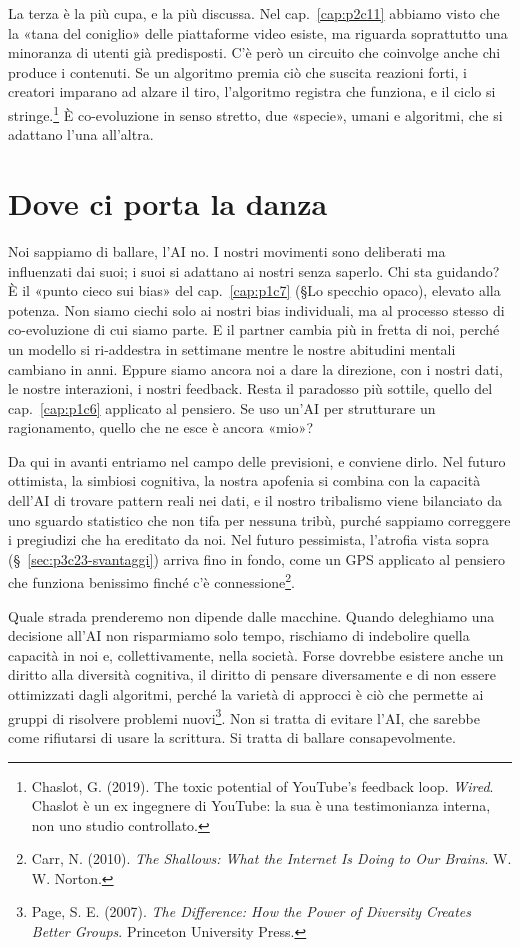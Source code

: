 La terza è la più cupa, e la più discussa. Nel cap.~\ref{cap:p2c11} abbiamo visto che la «tana del coniglio» delle piattaforme video esiste, ma riguarda soprattutto una minoranza di utenti già predisposti. C'è però un circuito che coinvolge anche chi produce i contenuti. Se un algoritmo premia ciò che suscita reazioni forti, i creatori imparano ad alzare il tiro, l'algoritmo registra che funziona, e il ciclo si stringe.\footnote{Chaslot, G. (2019). The toxic potential of YouTube's feedback loop. \textit{Wired}. Chaslot è un ex ingegnere di YouTube: la sua è una testimonianza interna, non uno studio controllato.} È co-evoluzione in senso stretto, due «specie», umani e algoritmi, che si adattano l'una all'altra.

\section{Dove ci porta la danza}

Noi sappiamo di ballare, l'AI no. I nostri movimenti sono deliberati ma influenzati dai suoi; i suoi si adattano ai nostri senza saperlo. Chi sta guidando? È il «punto cieco sui bias» del cap.~\ref{cap:p1c7} (§Lo specchio opaco), elevato alla potenza. Non siamo ciechi solo ai nostri bias individuali, ma al processo stesso di co-evoluzione di cui siamo parte. E il partner cambia più in fretta di noi, perché un modello si ri-addestra in settimane mentre le nostre abitudini mentali cambiano in anni. Eppure siamo ancora noi a dare la direzione, con i nostri dati, le nostre interazioni, i nostri feedback. Resta il paradosso più sottile, quello del cap.~\ref{cap:p1c6} applicato al pensiero. Se uso un'AI per strutturare un ragionamento, quello che ne esce è ancora «mio»?

Da qui in avanti entriamo nel campo delle previsioni, e conviene dirlo. Nel futuro ottimista, la simbiosi cognitiva, la nostra apofenia si combina con la capacità dell'AI di trovare pattern reali nei dati, e il nostro tribalismo viene bilanciato da uno sguardo statistico che non tifa per nessuna tribù, purché sappiamo correggere i pregiudizi che ha ereditato da noi. Nel futuro pessimista, l'atrofia vista sopra (§~\ref{sec:p3c23-svantaggi}) arriva fino in fondo, come un GPS applicato al pensiero che funziona benissimo finché c'è connessione\footnote{Carr, N. (2010). \textit{The Shallows: What the Internet Is Doing to Our Brains}. W. W. Norton.}.

Quale strada prenderemo non dipende dalle macchine. Quando deleghiamo una decisione all'AI non risparmiamo solo tempo, rischiamo di indebolire quella capacità in noi e, collettivamente, nella società. Forse dovrebbe esistere anche un diritto alla diversità cognitiva, il diritto di pensare diversamente e di non essere ottimizzati dagli algoritmi, perché la varietà di approcci è ciò che permette ai gruppi di risolvere problemi nuovi\footnote{Page, S. E. (2007). \textit{The Difference: How the Power of Diversity Creates Better Groups}. Princeton University Press.}. Non si tratta di evitare l'AI, che sarebbe come rifiutarsi di usare la scrittura. Si tratta di ballare consapevolmente.

